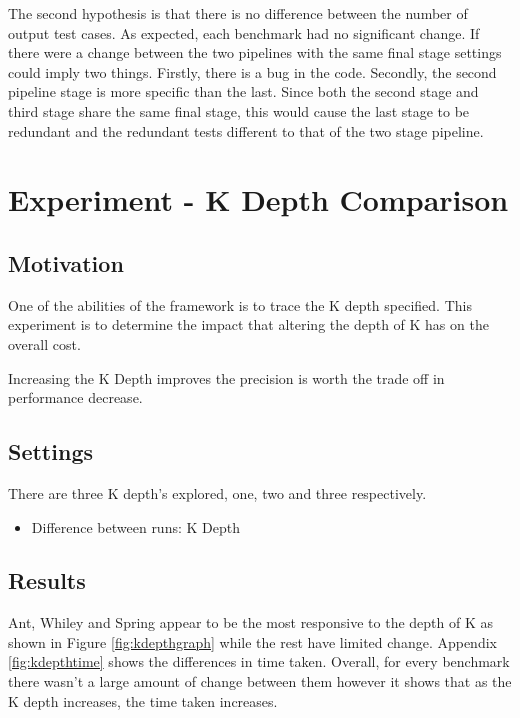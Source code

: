 The second hypothesis is that there is no difference between the number of output test cases. As expected, each benchmark had no significant change. If there were a change between the two pipelines with the same final stage settings could imply two things. Firstly, there is a bug in the code. Secondly, the second pipeline stage is more specific than the last. Since both the second stage and third stage share the same final stage, this would cause the last stage to be redundant and the redundant tests different to that of the two stage pipeline. 

\section{Experiment  - K Depth Comparison}
\label{kdepthcomp}
\subsection{Motivation}
One of the abilities of the framework is to trace the K depth specified. This experiment is to determine the impact that altering the depth of K has on the overall cost. 

\begin{hyp}
Increasing the K Depth improves the precision is worth the trade off in performance decrease.
\end{hyp}

\subsection{Settings}
There are three K depth's explored, one, two and three respectively.

\begin{itemize}
\item Difference between runs: K Depth
\end{itemize}

\subsection{Results}
Ant, Whiley and Spring appear to be the most responsive to the depth of K as shown in Figure \ref{fig:kdepthgraph} while the rest have limited change. Appendix \ref{fig:kdepthtime} shows the differences in time taken. Overall, for every benchmark there wasn't a large amount of change between them however it shows that as the K depth increases, the time taken increases.

